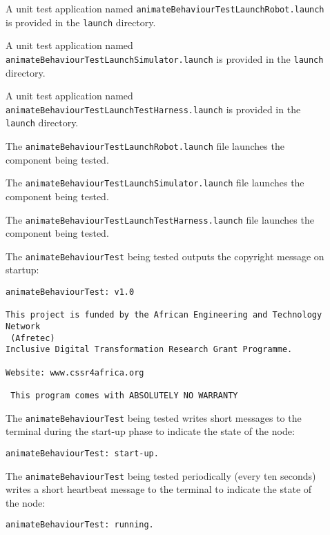 \documentclass{CSSRforAfrica}
\newcommand{\checkboxChecked}{\fbox{\ding{51}}} %
\newcommand{\checkboxDashed}{\fbox{--}}         %
\begin{document}
\begin{description}
\item[\checkboxChecked] A unit test application named {\small \verb+animateBehaviourTestLaunchRobot.launch+} is provided in the {\small \verb+launch+} directory. 

\item[\checkboxChecked] A unit test application named {\small \verb+animateBehaviourTestLaunchSimulator.launch+} is provided in the {\small \verb+launch+} directory. 

\item[\checkboxChecked] A unit test application named {\small \verb+animateBehaviourTestLaunchTestHarness.launch+} is provided in the {\small \verb+launch+} directory. 

\item[\checkboxChecked] The {\small \verb+animateBehaviourTestLaunchRobot.launch+} file  launches the component being tested.

\item[\checkboxDashed] The {\small \verb+animateBehaviourTestLaunchSimulator.launch+} file  launches the component being tested.

\item[\checkboxChecked] The {\small \verb+animateBehaviourTestLaunchTestHarness.launch+} file  launches the component being tested.

\newpage
\item[\checkboxChecked]  The {\small \verb+animateBehaviourTest+} being tested outputs the copyright message on startup:
\begin{verbatim}
animateBehaviourTest: v1.0
 
This project is funded by the African Engineering and Technology Network 
 (Afretec) 
Inclusive Digital Transformation Research Grant Programme.
 
Website: www.cssr4africa.org
 
 This program comes with ABSOLUTELY NO WARRANTY
\end{verbatim}

\item[\checkboxChecked]  The {\small \verb+animateBehaviourTest+} being tested writes short messages to the terminal during the start-up phase to
 indicate the state of the node:
\begin{verbatim}
animateBehaviourTest: start-up.
\end{verbatim}

\item[\checkboxChecked]  The {\small \verb+animateBehaviourTest+} being tested periodically (every ten seconds) writes a short heartbeat message to
 the terminal to indicate the state of the node:
\begin{verbatim}
animateBehaviourTest: running.
\end{verbatim}


\end{description}
\end{document}
